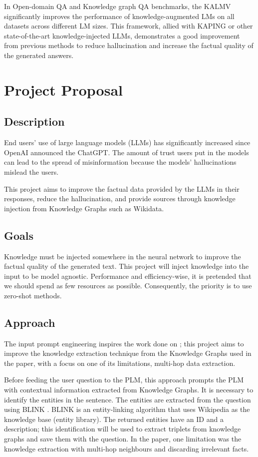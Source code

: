 \documentclass{article}
\begin{document}
In Open-domain QA and Knowledge graph QA benchmarks, the KALMV significantly improves the performance of knowledge-augmented LMs on all datasets across different LM sizes. This framework, allied with KAPING or other state-of-the-art knowledge-injected LLMs, demonstrates a good improvement from previous methods to reduce hallucination and increase the factual quality of the generated answers.  


\section{Project Proposal}

\subsection{Description}

End users' use of large language models (LLMs) has significantly increased since OpenAI announced the ChatGPT. The amount of trust users put in the models can lead to the spread of misinformation because the models' hallucinations mislead the users. 

This project aims to improve the factual data provided by the LLMs in their responses, reduce the hallucination, and provide sources through knowledge injection from Knowledge Graphs such as Wikidata.

\subsection{Goals}

Knowledge must be injected somewhere in the neural network to improve the factual quality of the generated text. This project will inject knowledge into the input to be model agnostic. Performance and efficiency-wise, it is pretended that we should spend as few resources as possible. Consequently, the priority is to use zero-shot methods.

\subsection{Approach}

The input prompt engineering inspires the work done on \cite{baek2023knowledgeaugmentedlanguagemodelprompting}; this project aims to improve the knowledge extraction technique from the Knowledge Graphs used in the paper, with a focus on one of its limitations, multi-hop data extraction.

Before feeding the user question to the PLM, this approach prompts the PLM with contextual information extracted from Knowledge Graphs. It is necessary to identify the entities in the sentence. The entities are extracted from the question using BLINK \cite{wu2019zero}. BLINK is an entity-linking algorithm that uses Wikipedia as the knowledge base (entity library). The returned entities have an ID and a description; this identification will be used to extract triplets from knowledge graphs and save them with the question. In the paper, one limitation was the knowledge extraction with multi-hop neighbours and discarding irrelevant facts. 
\end{document}
